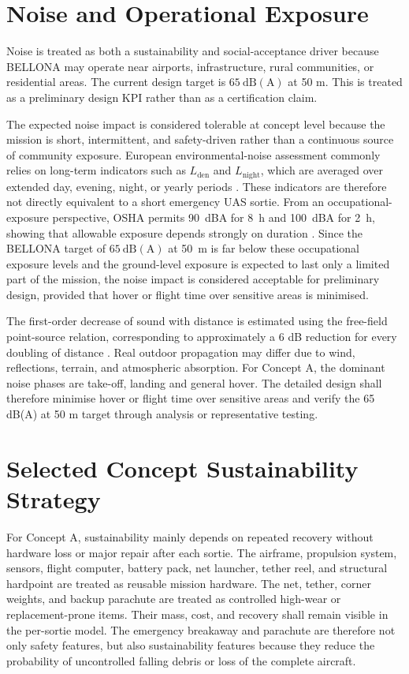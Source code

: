\section{Noise and Operational Exposure}

Noise is treated as both a sustainability and social-acceptance driver because BELLONA may operate near airports, infrastructure, rural communities, or residential areas. The current design target is \(65~\mathrm{dB(A)}\) at 50 m. This is treated as a preliminary design KPI rather than as a certification claim.

The expected noise impact is considered tolerable at concept level because the mission is short, intermittent, and safety-driven rather than a continuous source of community exposure. European environmental-noise assessment commonly relies on long-term indicators such as \(L_{\mathrm{den}}\) and \(L_{\mathrm{night}}\), which are averaged over extended day, evening, night, or yearly periods \cite{EuropeanUnion2002EnvironmentalNoiseDirective}. These indicators are therefore not directly equivalent to a short emergency UAS sortie. From an occupational-exposure perspective, OSHA permits 90~dBA for 8~h and 100~dBA for 2~h, showing that allowable exposure depends strongly on duration \cite{OccupationalSafetyHealthAdministration2026NoiseExposure}. Since the BELLONA target of \(65~\mathrm{dB(A)}\) at 50~m is far below these occupational exposure levels and the ground-level exposure is expected to last only a limited part of the mission, the noise impact is considered acceptable for preliminary design, provided that hover or flight time over sensitive areas is minimised.

The first-order decrease of sound with distance is estimated using the free-field point-source relation, corresponding to approximately a 6 dB reduction for every doubling of distance \cite{OccupationalSafety2026OSHANoise}. Real outdoor propagation may differ due to wind, reflections, terrain, and atmospheric absorption. For Concept A, the dominant noise phases are take-off, landing and general hover. The detailed design shall therefore minimise hover or flight time over sensitive areas and verify the 65 dB(A) at 50 m target through analysis or representative testing.

\section{Selected Concept Sustainability Strategy}

For Concept A, sustainability mainly depends on repeated recovery without hardware loss or major repair after each sortie. The airframe, propulsion system, sensors, flight computer, battery pack, net launcher, tether reel, and structural hardpoint are treated as reusable mission hardware. The net, tether, corner weights, and backup parachute are treated as controlled high-wear or replacement-prone items. Their mass, cost, and recovery shall remain visible in the per-sortie model. The emergency breakaway and parachute are therefore not only safety features, but also sustainability features because they reduce the probability of uncontrolled falling debris or loss of the complete aircraft.

